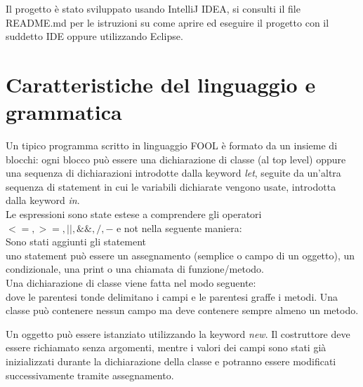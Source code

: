 \documentclass[a4paper]{article}   %
\begin{document}
Il progetto è stato sviluppato usando IntelliJ IDEA, si consulti il file README.md per le istruzioni
su come aprire ed eseguire il progetto con il suddetto IDE oppure utilizzando Eclipse.

\section{Caratteristiche del linguaggio e grammatica}

Un tipico programma scritto in linguaggio FOOL è formato da un insieme di blocchi: ogni blocco può essere una dichiarazione di classe (al top level)
oppure una sequenza di dichiarazioni introdotte dalla keyword \textit{let}, seguite da un'altra sequenza di statement in cui le variabili dichiarate vengono usate, introdotta
dalla keyword \textit{in}.\\


Le espressioni sono state estese a comprendere gli operatori $<=, >=, ||, \&\&, /, - $
   e not nella seguente maniera:\\


Sono stati aggiunti gli statement\\


uno statement può essere un assegnamento (semplice o campo di un oggetto), un condizionale, una print
o una chiamata di funzione/metodo.\\

Una dichiarazione di classe viene fatta nel modo seguente:\\


dove le parentesi tonde delimitano i campi e le parentesi graffe i metodi. Una classe può contenere nessun campo
ma deve contenere sempre almeno un metodo.


Un oggetto può essere istanziato utilizzando la keyword \textit{new}. Il costruttore deve essere richiamato senza argomenti, mentre i valori dei campi
sono stati già inizializzati durante la dichiarazione della classe e potranno essere modificati successivamente
tramite assegnamento.\\
\end{document}
